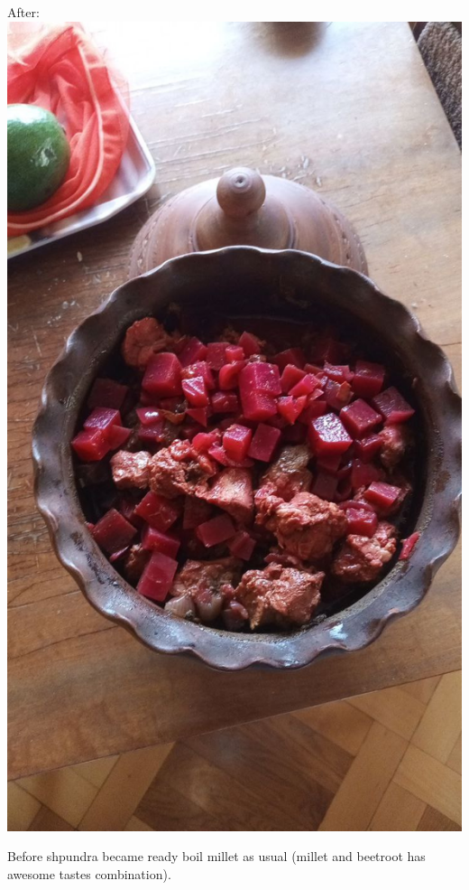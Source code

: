 \documentclass[11pt,a4paper]{article}
\begin{document}
After: \\
\includegraphics[scale=0.25]{shpundra_3.jpg}

Before shpundra became ready boil millet as usual (millet and beetroot has awesome tastes combination).


\newpage
\
\newpage
\doclicenseThis
\end{document}
